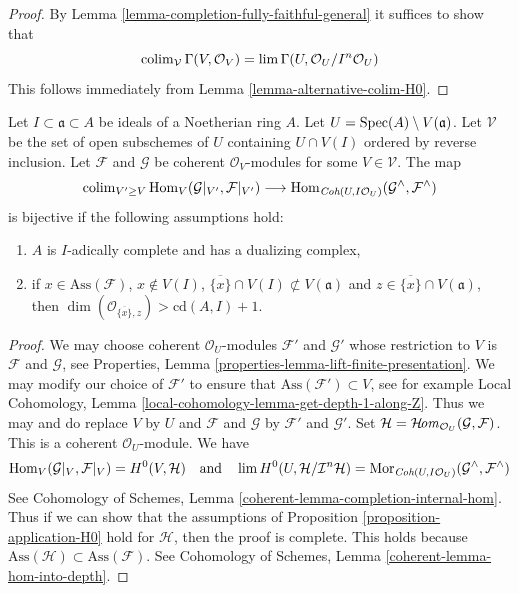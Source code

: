 \begin{proof}
By Lemma \ref{lemma-completion-fully-faithful-general}
it suffices to show that
$$
\mathop{\mathrm{colim}}\nolimits_\mathcal{V} \Gamma(V, \mathcal{O}_V) =
\mathop{\mathrm{lim}}\nolimits \Gamma(U, \mathcal{O}_U/I^n\mathcal{O}_U)
$$
This follows immediately from Lemma \ref{lemma-alternative-colim-H0}.
\end{proof}

\begin{lemma}
\label{lemma-fully-faithful-very-general}
Let $I \subset \mathfrak a \subset A$ be ideals of a Noetherian ring $A$.
Let $U = \mathop{\mathrm{Spec}}(A) \setminus V(\mathfrak a)$. Let $\mathcal{V}$ be the set
of open subschemes of $U$ containing $U \cap V(I)$ ordered by reverse
inclusion. Let $\mathcal{F}$ and
$\mathcal{G}$ be coherent $\mathcal{O}_V$-modules for some
$V \in \mathcal{V}$. The map
$$
\mathop{\mathrm{colim}}\nolimits_{V' \geq V} \mathop{\mathrm{Hom}}\nolimits_V(\mathcal{G}|_{V'}, \mathcal{F}|_{V'})
\longrightarrow
\mathop{\mathrm{Hom}}\nolimits_{\textit{Coh}(U, I\mathcal{O}_U)}(\mathcal{G}^\wedge, \mathcal{F}^\wedge)
$$
is bijective if the following assumptions hold:
\begin{enumerate}
\item $A$ is $I$-adically complete and has a dualizing complex,
\item if $x \in \text{Ass}(\mathcal{F})$, $x \not \in V(I)$,
$\overline{\{x\}} \cap V(I) \not \subset V(\mathfrak a)$
and $z \in \overline{\{x\}} \cap V(\mathfrak a)$, then
$\dim(\mathcal{O}_{\overline{\{x\}}, z}) > \text{cd}(A, I) + 1$.
\end{enumerate}
\end{lemma}

\begin{proof}
We may choose coherent $\mathcal{O}_U$-modules
$\mathcal{F}'$ and $\mathcal{G}'$ whose restriction to $V$
is $\mathcal{F}$ and $\mathcal{G}$, see
Properties, Lemma \ref{properties-lemma-lift-finite-presentation}.
We may modify our choice of $\mathcal{F}'$ to ensure that
$\text{Ass}(\mathcal{F}') \subset V$, see for example
Local Cohomology, Lemma \ref{local-cohomology-lemma-get-depth-1-along-Z}.
Thus we may and do replace $V$ by $U$ and $\mathcal{F}$ and $\mathcal{G}$
by $\mathcal{F}'$ and $\mathcal{G}'$.
Set $\mathcal{H} = \mathop{\mathcal{H}\!\mathit{om}}\nolimits_{\mathcal{O}_U}(\mathcal{G}, \mathcal{F})$.
This is a coherent $\mathcal{O}_U$-module. We have
$$
\mathop{\mathrm{Hom}}\nolimits_V(\mathcal{G}|_V, \mathcal{F}|_V) =
H^0(V, \mathcal{H})
\quad\text{and}\quad
\mathop{\mathrm{lim}}\nolimits H^0(U, \mathcal{H}/\mathcal{I}^n\mathcal{H}) =
\mathop{\mathrm{Mor}}\nolimits_{\textit{Coh}(U, I\mathcal{O}_U)}
(\mathcal{G}^\wedge, \mathcal{F}^\wedge)
$$
See Cohomology of Schemes, Lemma \ref{coherent-lemma-completion-internal-hom}.
Thus if we can show that the assumptions of
Proposition \ref{proposition-application-H0}
hold for $\mathcal{H}$, then the proof is complete.
This holds because
$\text{Ass}(\mathcal{H}) \subset \text{Ass}(\mathcal{F})$.
See Cohomology of Schemes, Lemma
\ref{coherent-lemma-hom-into-depth}.
\end{proof}








